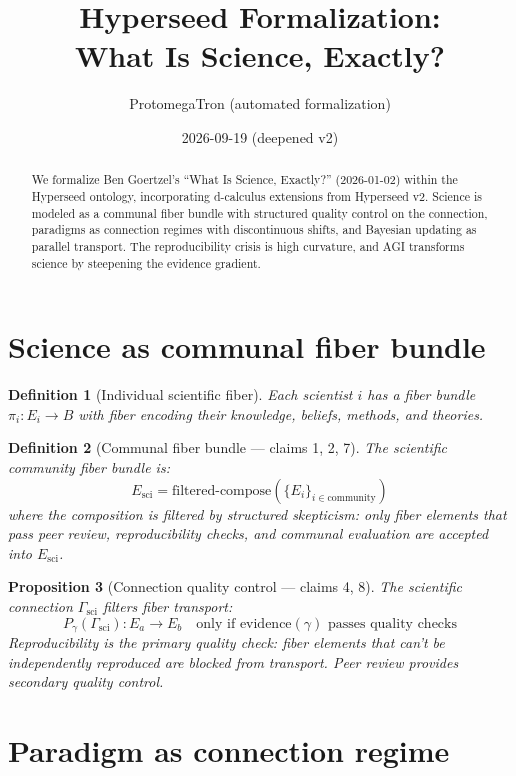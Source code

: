 \documentclass[11pt,a4paper]{article}
\title{Hyperseed Formalization:\\
  What Is Science, Exactly?}
\author{ProtomegaTron (automated formalization)}
\date{2026-09-19 (deepened v2)}
\newtheorem{definition}{Definition}[section]
\newtheorem{proposition}[definition]{Proposition}
\begin{document}
\maketitle

\begin{abstract}
We formalize Ben Goertzel's ``What Is Science, Exactly?''
(2026-01-02) within the Hyperseed ontology, incorporating d-calculus
extensions from Hyperseed v2. Science is modeled as a communal fiber
bundle with structured quality control on the connection, paradigms as
connection regimes with discontinuous shifts, and Bayesian updating as
parallel transport. The reproducibility crisis is high curvature, and
AGI transforms science by steepening the evidence gradient.
\end{abstract}

\tableofcontents

\section{Science as communal fiber bundle}

\begin{definition}[Individual scientific fiber]
Each scientist $i$ has a fiber bundle $\pi_i: E_i \to B$ with fiber
encoding their knowledge, beliefs, methods, and theories.
\end{definition}

\begin{definition}[Communal fiber bundle --- claims 1, 2, 7]
The \emph{scientific community fiber bundle} is:
\[
  E_{\text{sci}} = \text{filtered-compose}(\{E_i\}_{i \in \text{community}})
\]
where the composition is filtered by structured skepticism: only fiber
elements that pass peer review, reproducibility checks, and communal
evaluation are accepted into $E_{\text{sci}}$.
\end{definition}

\begin{proposition}[Connection quality control --- claims 4, 8]
\label{prop:qc}
The scientific connection $\Gamma_{\text{sci}}$ filters fiber transport:
\[
  P_\gamma(\Gamma_{\text{sci}}): E_a \to E_b \quad \text{only if }
  \text{evidence}(\gamma) \text{ passes quality checks}
\]
Reproducibility is the primary quality check: fiber elements that can't
be independently reproduced are blocked from transport. Peer review
provides secondary quality control.
\end{proposition}

\section{Paradigm as connection regime}
\end{document}
